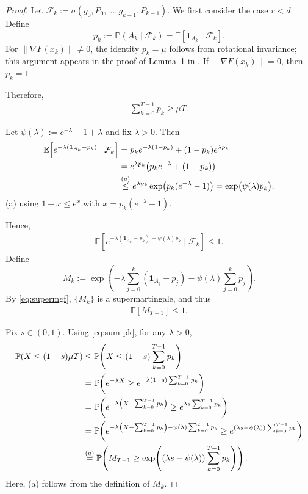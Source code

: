 \documentclass[10pt]{article}
\begin{document}
\begin{proof}
Let $\mathcal{F}_k := \sigma(g_0,P_0,\dots,g_{k-1},P_{k-1})$.
We first consider the case 
$r<d$.
Define
\[
p_k:=\mathbb{P}(A_k\mid \mathcal{F}_k)
=\mathbb{E}[\mathbf{1}_{A_k}\mid \mathcal{F}_k].
\]
For $\|\nabla F(x_k)\|\neq 0$, the identity $p_k=\mu$ follows from rotational invariance;
this argument appears in the proof of Lemma~1 in \citet{kozak2021}.
If $\|\nabla F(x_k)\|=0$, then $p_k=1$.

Therefore,
\begin{align}
\sum_{k=0}^{T-1} p_k \ge \mu T.
\label{eq:sum-pk}
\end{align}

Let $\psi(\lambda):=e^{-\lambda}-1+\lambda$ and fix $\lambda>0$.
Then
\begin{align}
\mathbb{E}\!\left[e^{-\lambda(\mathbf{1}_{A_k}-p_k)}\mid \mathcal{F}_k\right]
&= p_k e^{-\lambda(1-p_k)} + (1-p_k)e^{\lambda p_k} \notag\\
&= e^{\lambda p_k}\big(p_k e^{-\lambda}+(1-p_k)\big) \notag\\
&\overset{(a)}{\le} e^{\lambda p_k}\exp\!\big(p_k(e^{-\lambda}-1)\big)
= \exp\!\big(\psi(\lambda)p_k\big).
\label{eq:cher-step}
\end{align}
(a)\; using $1+x\le e^x$ with $x=p_k(e^{-\lambda}-1)$.

Hence,
\begin{align}
\mathbb{E}\!\left[e^{-\lambda(\mathbf{1}_{A_k}-p_k)-\psi(\lambda)p_k}\mid \mathcal{F}_k\right]\le 1.
\label{eq:supermgf}
\end{align}
Define
\[
M_k := \exp\!\left(-\lambda\sum_{j=0}^k(\mathbf{1}_{A_j}-p_j)-\psi(\lambda)\sum_{j=0}^k p_j\right).
\]
By \eqref{eq:supermgf}, $\{M_k\}$ is a supermartingale, and thus
\begin{align}
\mathbb{E}[M_{T-1}]\le 1.
\label{eq:MT-1}
\end{align}

Fix $s\in(0,1)$. Using \eqref{eq:sum-pk}, for any $\lambda>0$,
\begin{align}
\mathbb{P}(X \le (1-s)\mu T)
&\le
\mathbb{P}\!\left(X \le (1-s)\sum_{k=0}^{T-1}p_k\right) \notag\\
&=
\mathbb{P}\!\left(e^{-\lambda X} \ge e^{-\lambda(1-s)\sum_{k=0}^{T-1}p_k}\right) \notag\\
&=
\mathbb{P}\!\left(e^{-\lambda\left(X-\sum_{k=0}^{T-1}p_k\right)}
\ge e^{\lambda s\sum_{k=0}^{T-1}p_k}\right) \notag\\
&=
\mathbb{P}\!\left(
e^{-\lambda\left(X-\sum_{k=0}^{T-1}p_k\right)-\psi(\lambda)\sum_{k=0}^{T-1}p_k}
\ge
e^{(\lambda s-\psi(\lambda))\sum_{k=0}^{T-1}p_k}
\right) \notag\\
&\overset{(a)}=
\mathbb{P}\!\left(
M_{T-1} \ge
\exp\!\left((\lambda s-\psi(\lambda))\sum_{k=0}^{T-1}p_k\right)
\right).
\label{eq:reduce-to-M}
\end{align}
Here, (a) follows from the definition of $M_k$.




\end{proof}
\end{document}

